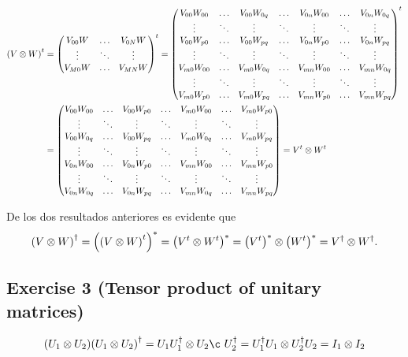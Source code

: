 \begin{subequations}
\begin{align}
\qty(V\otimes W)^t&=\mqty(V_{00}W&\dots&V_{0N}W\\ 
\vdots&\ddots&\vdots\\ V_{M0}W&\dots&V_{MN}W)^t=
\mqty(V_{00}W_{00}&\dots&V_{00}W_{0q}&\dots&V_{0n}W_{00}&\dots&V_{0n}W_{0q}\\ 
\vdots&\ddots&\vdots&\ddots&\vdots&\ddots&\vdots\\
V_{00}W_{p0}&\dots&V_{00}W_{pq}&\dots&V_{0n}W_{p0}&\dots&V_{0n}W_{pq}\\ 
\vdots&\ddots&\vdots&\ddots&\vdots&\ddots&\vdots\\
V_{m0}W_{00}&\dots&V_{m0}W_{0q}&\dots&V_{mn}W_{00}&\dots&V_{mn}W_{0q}\\ 
\vdots&\ddots&\vdots&\ddots&\vdots&\ddots&\vdots\\
V_{m0}W_{p0}&\dots&V_{m0}W_{pq}&\dots&V_{mn}W_{p0}&\dots&V_{mn}W_{pq})^t\\
&=\mqty(V_{00}W_{00}&\dots&V_{00}W_{p0}&\dots&V_{m0}W_{00}&\dots&V_{m0}W_{p0}\\ 
\vdots&\ddots&\vdots&\ddots&\vdots&\ddots&\vdots\\
V_{00}W_{0q}&\dots&V_{00}W_{pq}&\dots&V_{m0}W_{0q}&\dots&V_{m0}W_{pq}\\ 
\vdots&\ddots&\vdots&\ddots&\vdots&\ddots&\vdots\\
V_{0n}W_{00}&\dots&V_{0n}W_{p0}&\dots&V_{mn}W_{00}&\dots&V_{mn}W_{p0}\\ 
\vdots&\ddots&\vdots&\ddots&\vdots&\ddots&\vdots\\
V_{0n}W_{0q}&\dots&V_{0n}W_{pq}&\dots&V_{mn}W_{0q}&\dots&V_{mn}W_{pq})
=V^t\otimes W^t
\end{align}
\end{subequations}

De los dos resultados anteriores es evidente que 
\begin{align}
\qty(V\otimes W)^{\dagger}=\qty(\qty(V\otimes W)^{t})^*
=\qty(V^t\otimes W^{t})^*=\qty(V^t)^*\otimes \qty(W^t)^*
=V^{\dagger}\otimes W^{\dagger}.
\end{align}

\subsection{Exercise 3 (Tensor product of unitary matrices)}
\begin{align}
\qty(U_1\otimes U_2)\qty(U_1\otimes U_2)^{\dagger}=
U_1U_1^{\dagger}\otimes U_2¸U_2^{\dagger}=
U_1^{\dagger}U_1\otimes U_2^{\dagger}U_2=I_1\otimes I_2
\end{align}

